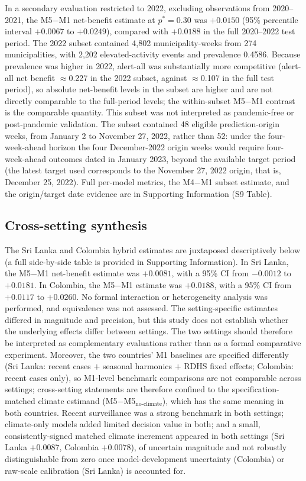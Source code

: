 \documentclass[11pt,a4paper]{article}
\begin{document}
In a secondary evaluation restricted to 2022, excluding observations from 2020--2021, the M5$-$M1 net-benefit estimate at $p^*=0.30$ was $+0.0150$ (95\% percentile interval $+0.0067$ to $+0.0249$), compared with $+0.0188$ in the full 2020--2022 test period. The 2022 subset contained 4{,}802 municipality-weeks from 274 municipalities, with 2{,}202 elevated-activity events and prevalence 0.4586. Because prevalence was higher in 2022, alert-all was substantially more competitive (alert-all net benefit $\approx$0.227 in the 2022 subset, against $\approx$0.107 in the full test period), so absolute net-benefit levels in the subset are higher and are not directly comparable to the full-period levels; the within-subset M5$-$M1 contrast is the comparable quantity. This subset was not interpreted as pandemic-free or post-pandemic validation. The subset contained 48 eligible prediction-origin weeks, from January 2 to November 27, 2022, rather than 52: under the four-week-ahead horizon the four December-2022 origin weeks would require four-week-ahead outcomes dated in January 2023, beyond the available target period (the latest target used corresponds to the November 27, 2022 origin, that is, December 25, 2022). Full per-model metrics, the M4$-$M1 subset estimate, and the origin/target date evidence are in Supporting Information (S9 Table).

\subsection{Cross-setting synthesis}
The Sri Lanka and Colombia hybrid estimates are juxtaposed descriptively below (a full side-by-side table is provided in Supporting Information). In Sri Lanka, the M5$-$M1 net-benefit estimate was $+0.0081$, with a 95\% CI from $-0.0012$ to $+0.0181$. In Colombia, the M5$-$M1 estimate was $+0.0188$, with a 95\% CI from $+0.0117$ to $+0.0260$. No formal interaction or heterogeneity analysis was performed, and equivalence was not assessed. The setting-specific estimates differed in magnitude and precision, but this study does not establish whether the underlying effects differ between settings. The two settings should therefore be interpreted as complementary evaluations rather than as a formal comparative experiment. Moreover, the two countries' M1 baselines are specified differently (Sri Lanka: recent cases $+$ seasonal harmonics $+$ RDHS fixed effects; Colombia: recent cases only), so M1-level benchmark comparisons are not comparable across settings; cross-setting statements are therefore confined to the specification-matched climate estimand (M5$-$M5$_{\text{no-climate}}$), which has the same meaning in both countries. Recent surveillance was a strong benchmark in both settings; climate-only models added limited decision value in both; and a small, consistently-signed matched climate increment appeared in both settings (Sri Lanka $+0.0087$, Colombia $+0.0078$), of uncertain magnitude and not robustly distinguishable from zero once model-development uncertainty (Colombia) or raw-scale calibration (Sri Lanka) is accounted for.
\end{document}
